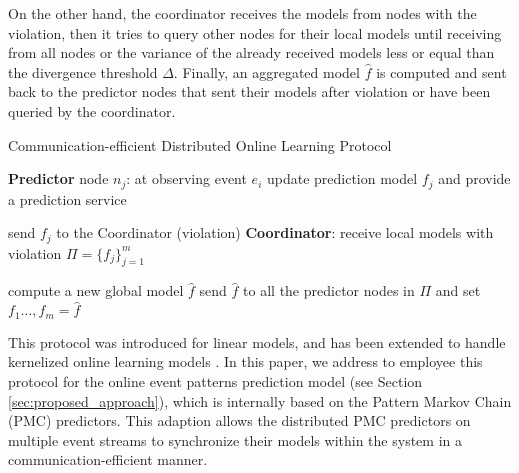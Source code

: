\par On the other hand, the coordinator receives the models from nodes with the violation, then it tries to query other nodes for their local models until receiving from all nodes or the variance of the already received models less or equal than the divergence threshold  $\Delta$. Finally, an aggregated model $\hat{f}$ is computed and sent back to the predictor nodes that sent their models after violation or have been queried by the coordinator.

\begin{algorithm}
	\caption{Communication-efficient Distributed Online Learning Protocol } 
	\begin{algorithmic}[1] 
		\Statex  \Indm  \textbf{Predictor} node $n_j$: at observing event $e_i$
		\Statex \Indp update prediction model $f_{j}$ and provide a prediction service 

		\Statex {}  
		\Statex send  $f_{j}$ to the Coordinator (violation) 
		\Statex \Indm \textbf{Coordinator}:
		\Statex \Indp receive local models with violation
		 $\Pi=\{f_{j}\}_{j=1}^m$
	
	
		\Statex {}
        \Statex
		\Statex compute a new global model $\hat{f}$ 
		\Statex send $\hat{f}$ to all the predictor nodes in $\Pi$ and set $f_{1}\dots, f_{m}=\hat{f} $ 
		\Statex {}
	\end{algorithmic}
	\label{algonline:dol}
\end{algorithm}


This protocol was introduced for linear models, and has been  extended to handle kernelized online learning models \cite{kamp2016communication}. In this paper, we address to employee this protocol for the online event patterns prediction model (see Section \ref{sec:proposed_approach}), which is internally based on the Pattern Markov Chain (PMC) predictors. This adaption allows the distributed PMC predictors on multiple event streams to  synchronize their models within the system in a communication-efficient manner. 

